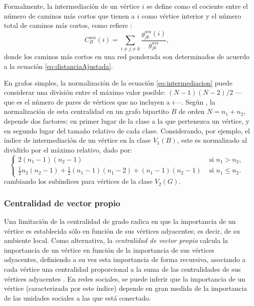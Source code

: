 \documentclass[letterpaper, 11pt]{book}
\theoremstyle{definition}
\theoremstyle{remark}
\begin{document}
Formalmente, la intermediación de un vértice $i$ se define como el cociente entre el número de caminos más cortos que tienen a $i$ como vértice interior y el número total de caminos más cortos, como refiere \citet{2010_Opsahl_NodeCentralityWeighted}:
\begin{equation}\label{eq:intermediacion}
    C_{B}^{w \alpha}(i) = \sum_{i \neq j \neq k} \frac{g_{jk}^{w \alpha}(i)}{g_{jk}^{w \alpha}},
\end{equation}
donde los caminos más cortos en una red ponderada son determinados de acuerdo a la ecuación \ref{eq:distanciaAjustada}.

En grafos simples, la normalización de la ecuación \ref{eq:intermediacion} puede considerar una división entre el máximo valor posible: $(N-1)(N-2)/2$ ---que es el número de pares de vértices que no incluyen a $i$---. 
Según \citet{1997_Borgatti_2ModeSNA}, la normalización de esta centralidad en un grafo bipartito $B$ de orden $N = n_{1}+n_{2}$, depende dos factores; en primer lugar de la clase a la que pertenezca un vértice, y en segundo lugar del tamaño relativo de cada clase. 
Considerando, por ejemplo, el índice de intermediación de un vértice en la clase $V_{1}(B)$, este es normalizado al dividirlo por el máximo relativo, dado por: 
\begin{equation}\label{eq:intermediacion_normalizada}
\begin{cases} 
    2(n_{1}-1)(n_{2}-1)  &  \text{ si } n_{1} > n_{2},\\ 
    \frac{1}{2}n_{2}(n_{2}-1) + \frac{1}{2}(n_{1}-1)(n_{1}-2) + (n_{1}-1)(n_{2}-1) & \text{ si } n_{1} \leq n_{2}.
\end{cases}
\end{equation}
cambiando los subíndices para vértices de la clase $V_{2}(G)$.



\subsubsection{Centralidad de vector propio}
\label{sec:Centralidad_vector_propio}

Una limitación de la centralidad de grado radica en que la importancia de un vértice es establecida sólo en función de sus vértices adyacentes; es decir, de su ambiente local. 
Como alternativa, la \emph{centralidad de vector propio} calcula la importancia de un vértice en función de la importancia de sus vértices adyacentes, definiendo a su vez esta importancia de forma recursiva, asociando a cada vértice una centralidad proporcional a la suma de las centralidades de sus vértices adyacentes \citep[169--172]{2010_Newman_Networks}. 
En redes sociales, se puede inferir que la importancia de un vértice (caracterizada por este índice) depende en gran medida de la importancia de las unidades sociales a las que está conectado. 
\end{document}
